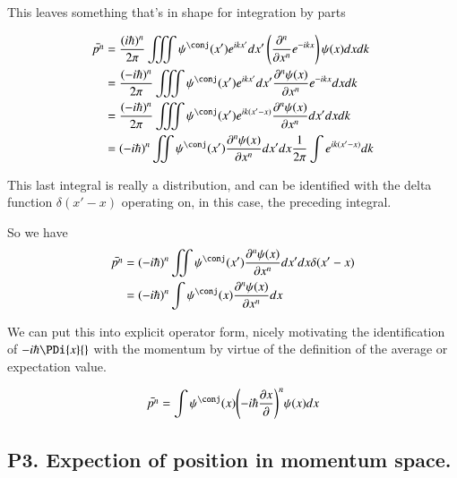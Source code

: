 \documentclass{article}
\newcommand{\PDN}[3]{\frac{\partial^{#3} {#2}}{\partial {#1}^{#3}}}
\begin{document}
This leaves something that's in shape for integration by parts

\begin{align*}
\bar{p^n} 
&= \frac{(i\hbar)^n}{2\pi} \iiint \psi^\conj(x') e^{ikx'} dx' \left( \PDN{x}{}{n}e^{-i k x} \right) \psi(x) dx dk \\
&= \frac{(-i\hbar)^n}{2\pi} \iiint \psi^\conj(x') e^{ikx'} dx' \PDN{x}{\psi(x)}{n} e^{-i k x} dx dk \\
&= \frac{(-i\hbar)^n}{2\pi} \iiint \psi^\conj(x') e^{ik(x'-x)} \PDN{x}{\psi(x)}{n} dx' dx dk \\
&= {(-i\hbar)^n}{} \iint \psi^\conj(x') \PDN{x}{\psi(x)}{n} dx' dx \inv{2\pi}\int e^{ik(x'-x)} dk \\
\end{align*}

This last integral is really a distribution, and can be identified with the delta function $\delta(x'-x)$ operating on, in this case, the preceding integral.
%


So we have
\begin{align*}
\bar{p^n} 
&= {(-i\hbar)^n}{} \iint \psi^\conj(x') \PDN{x}{\psi(x)}{n} dx' dx \delta(x'-x) \\
&= {(-i\hbar)^n}{} \int \psi^\conj(x) \PDN{x}{\psi(x)}{n} dx \\
\end{align*}

We can put this into explicit operator form, nicely motivating the identification of $-i\hbar \PDi{x}{}$ with the momentum by virtue 
of the definition of the average or expectation value.

\begin{align*}
\bar{p^n} 
&= \int \psi^\conj(x) {\left( -i \hbar \PD{x}{} \right)}^n {\psi(x)} dx \\
\end{align*}

\subsection{ P3.  Expection of position in momentum space. }
\end{document}
